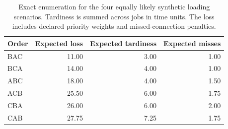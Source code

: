 \begin{table}[htbp]\centering\small
\begin{tabular}{lrrr}\toprule
Order & Expected loss & Expected tardiness & Expected misses\\\midrule
BAC & 11.00 & 3.00 & 1.00\\
BCA & 14.00 & 4.00 & 1.00\\
ABC & 18.00 & 4.00 & 1.50\\
ACB & 25.50 & 6.00 & 1.75\\
CBA & 26.00 & 6.00 & 2.00\\
CAB & 27.75 & 7.25 & 1.75\\
\bottomrule\end{tabular}
\caption{Exact enumeration for the four equally likely synthetic loading scenarios. Tardiness is summed across jobs in time units. The loss includes declared priority weights and missed-connection penalties.}\label{tab:schedules}
\end{table}

